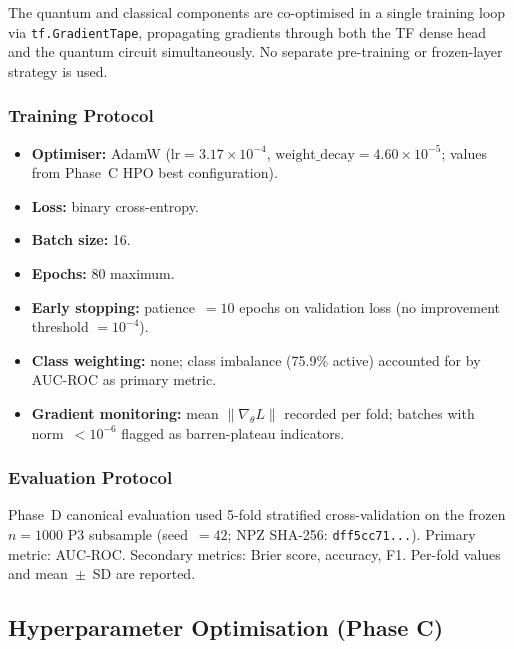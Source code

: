 The quantum and classical components are co-optimised in a single training
loop via \texttt{tf.GradientTape}, propagating gradients through both the
TF dense head and the quantum circuit simultaneously. No separate
pre-training or frozen-layer strategy is used.

\subsubsection{Training Protocol}

\begin{itemize}
  \item \textbf{Optimiser:} AdamW\cite{loshchilov2019decoupled}
        ($\text{lr} = 3.17 \times 10^{-4}$,
         $\text{weight\_decay} = 4.60 \times 10^{-5}$;
         values from Phase~C HPO best configuration).
  \item \textbf{Loss:} binary cross-entropy.
  \item \textbf{Batch size:} 16.
  \item \textbf{Epochs:} 80 maximum.
  \item \textbf{Early stopping:} patience~$= 10$ epochs on validation loss
        (no improvement threshold $= 10^{-4}$).
  \item \textbf{Class weighting:} none; class imbalance (75.9\% active)
        accounted for by AUC-ROC as primary metric.
  \item \textbf{Gradient monitoring:} mean $\|\nabla_\theta L\|$ recorded
        per fold; batches with norm~$< 10^{-6}$ flagged as barren-plateau
        indicators.
\end{itemize}

\subsubsection{Evaluation Protocol}

Phase~D canonical evaluation used 5-fold stratified cross-validation on the
frozen $n = 1000$ P3 subsample (seed~$= 42$; NPZ SHA-256:
\texttt{dff5cc71...}). Primary metric: AUC-ROC. Secondary metrics: Brier
score, accuracy, F1. Per-fold values and mean~$\pm$~SD are reported.


\subsection{Hyperparameter Optimisation (Phase C)}
\label{sec:hpo}

